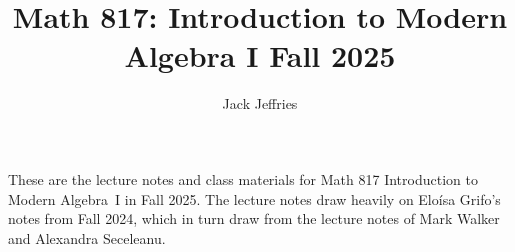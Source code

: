 \documentclass[12pt]{amsart}
\theoremstyle{definition}
\newtheorem{definition}[theorem]{Definition}
\newtheorem{remark}[theorem]{Remark}
\numberwithin{equation}{theorem}
\def\to{\longrightarrow}
\def\mapsto{\longmapsto}
\begin{document}
\title[Math 817 Fall 2025]{Math 817: Introduction to Modern Algebra I Fall 2025}

\author{Jack Jeffries}
\maketitle

These are the lecture notes and class materials for Math 817 Introduction to Modern Algebra~I in Fall 2025. The lecture notes draw heavily on Elo\'isa Grifo's notes from Fall 2024, which in turn draw from the lecture notes of Mark Walker and Alexandra Seceleanu.

\end{document}
